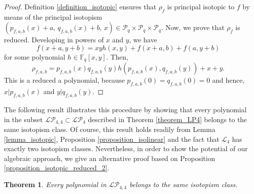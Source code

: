 \documentclass[pdflatex,sn-mathphys-num]{sn-jnl}
\theoremstyle{thmstyleone}%
\newtheorem{theorem}{Theorem}[section]
\begin{document}
\begin{proof} Definition \ref{definition_isotopic} ensures that $\rho_f$ is principal isotopic to $f$ by means of the principal isotopism $\left(p_{f,a,b}(x)+a,\,q_{f,a,b}(x)+b,\,x\right)\in\mathcal{P}_q\times\mathcal{P}_q\times\mathcal{P}_q$. Now, we prove that $\rho_f$ is reduced. Developing in powers of $x$ and $y$,  we have
\[f(x+a,y+b)=xyh(x,y)+f(x+a,b)+f(a,y+b)\]
for some polynomial $h\in\mathbb{F}_q[x,y]$. Then,
\[\rho_{f,a,b}=p_{f,a,b}(x)q_{f,a,b}(y)h(p_{f,a,b}(x),q_{f,a,b}(y))+x+y.\]
This is a reduced a polynomial, because $p_{f,a,b}(0)=q_{f,a,b}(0)=0$ and hence, $x|p_{f,a,b}(x)$ and $y|q_{f,a,b}(y)$.
\end{proof}

\vspace{0.2cm}

The following result illustrates this procedure by showing that every polynomial in the subset $\mathcal{LP}_{4,4}\subset \mathcal{LP}_4$ described in Theorem \ref{theorem_LP4} belongs to the same isotopism class. Of course, this result holds readily from Lemma \ref{lemma_isotopic}, Proposition \ref{proposition_isolinear} and the fact that $\mathcal{L}_4$ has exactly two isotopism classes. Nevertheless, in order to show the potential of our algebraic approach, we give an alternative proof based on Proposition \ref{proposition_isotopic_reduced_2}.

\begin{theorem}\label{theorem_S2} Every polynomial in $\mathcal{LP}_{4,4}$ belongs to the same isotopism class.
\end{theorem}
\end{document}
